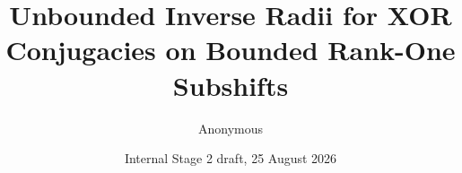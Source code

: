 \documentclass[11pt,a4paper]{amsart}
\title[Unbounded inverse radii]{Unbounded Inverse Radii for XOR Conjugacies on Bounded Rank-One Subshifts}
\author{Anonymous}
\date{Internal Stage 2 draft, 25 August 2026}
\theoremstyle{definition}
\theoremstyle{remark}
\begin{document}

\maketitle







\FloatBarrier



\end{document}
